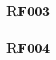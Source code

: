 
\subsubsection{RF003}
\label{subs:RF003}

%
%
%
%
%
%
%

\subsubsection{RF004}
\label{subs:RF004}

